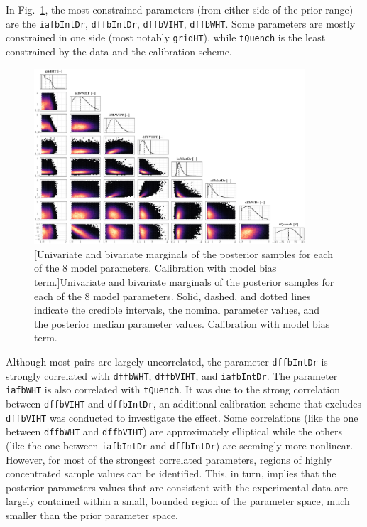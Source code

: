 In Fig.~\ref{fig:ch5_plot_ens_all_disc_centered}, the most constrained parameters (from either side of the prior range) are the \texttt{iafbIntDr}, \texttt{dffbIntDr}, \texttt{dffbVIHT}, \texttt{dffbWHT}.
Some parameters are mostly constrained in one side (most notably \texttt{gridHT}), while \texttt{tQuench} is the least constrained by the data and the calibration scheme.

\begin{figure}
	\centering
	\includegraphics[width=0.90\textwidth]{../figures/chapter5/figures/plotEnsAllDiscCentered}
		[Univariate and bivariate marginals of the posterior samples for each of the $8$ model parameters. Calibration with model bias term.]{Univariate and bivariate marginals of the posterior samples for each of the $8$ model parameters. Solid, dashed, and dotted lines indicate the credible intervals, the nominal parameter values, and the posterior median parameter values. Calibration with model bias term.}
	\label{fig:ch5_plot_ens_all_disc_centered}
\end{figure}

Although most pairs are largely uncorrelated, the parameter \texttt{dffbIntDr} is strongly correlated with \texttt{dffbWHT}, \texttt{dffbVIHT}, and \texttt{iafbIntDr}.
The parameter \texttt{iafbWHT} is also correlated with \texttt{tQuench}.
It was due to the strong correlation between \texttt{dffbVIHT} and \texttt{dffbIntDr}, an additional calibration scheme that excludes \texttt{dffbVIHT} was conducted to investigate the effect.
Some correlations (like the one between \texttt{dffbWHT} and \texttt{dffbVIHT}) are approximately elliptical while the others (like the one between \texttt{iafbIntDr} and \texttt{dffbIntDr}) are seemingly more nonlinear.
However, for most of the strongest correlated parameters, regions of highly concentrated sample values can be identified.
This, in turn, implies that the posterior parameters values that are consistent with the experimental data are largely contained within a small, bounded region of the parameter space, much smaller than the prior parameter space.

